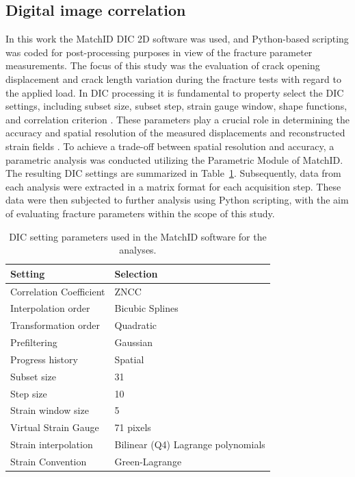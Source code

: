 \documentclass[3p,times,procedia]{elsarticle}
\begin{document}
\subsection{Digital image correlation}\label{Ss:dic}

In this work the MatchID DIC 2D software was used, and Python-based scripting was coded for post-processing purposes in view of the fracture parameter measurements. The focus of this study was the evaluation of crack opening displacement and crack length variation during the fracture tests with regard to the applied load. In DIC processing it is fundamental to property select the DIC settings, including subset size, subset step, strain gauge window, shape functions, and correlation criterion \citep{DICguide2018}. These parameters play a crucial role in determining the accuracy and spatial resolution of the measured displacements and reconstructed strain fields \citep{Xavier2012207,PereiraandXavier2018}. To achieve a trade-off between spatial resolution and accuracy, a parametric analysis was conducted utilizing the Parametric Module of MatchID. The resulting DIC settings are summarized in Table~\ref{tab:MatchID_param}. Subsequently, data from each analysis were extracted in a matrix format for each acquisition step. These data were then subjected to further analysis using Python scripting, with the aim of evaluating fracture parameters within the scope of this study.

\begin{table}[h]
	\centering
	\begin{tabular}{m{} m{}}
		\toprule
		\textbf{Setting} & \textbf{Selection} \\
		\midrule
		Correlation Coefficient & ZNCC \\
		Interpolation order & Bicubic Splines \\ 
		Transformation order & Quadratic \\
		Prefiltering & Gaussian \\
		Progress history & Spatial \\
		Subset size & 31 \\
		Step size & 10 \\
		Strain window size & 5 \\ 
		Virtual Strain Gauge & 71 pixels \\
		Strain interpolation & Bilinear (Q4) Lagrange polynomials \\
		Strain Convention & Green-Lagrange \\\bottomrule
	\end{tabular}
	\caption{DIC setting parameters used in the MatchID software for the analyses.}
	\label{tab:MatchID_param}
\end{table}
\end{document}
